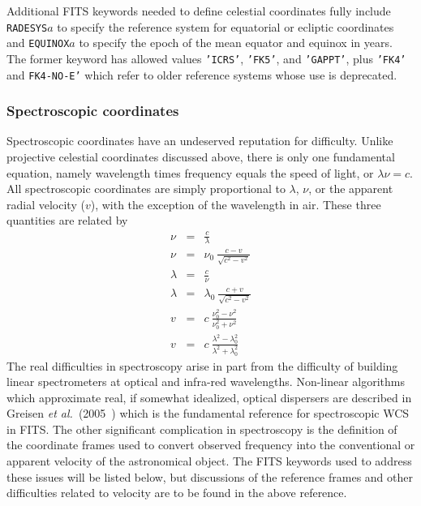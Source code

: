 \documentclass[twoside]{article}
\newcommand{\etal}{{\it et al.}}
\newcommand{\keyw}[1]{\hbox{{\tt #1}}}
\newcommand{\vv}{v}
\begin{document}
Additional FITS keywords needed to define celestial coordinates fully
include \keyw{RADESYS$a$} to specify the reference system for equatorial
or ecliptic coordinates and \keyw{EQUINOX$a$} to specify the epoch of
the mean equator and equinox in years.  The former keyword has allowed
values \keyw{'ICRS'}, \keyw{'FK5'}, and \keyw{'GAPPT'}, plus \keyw{'FK4'}
and \keyw{FK4-NO-E'} which refer to older reference systems whose use
is deprecated.

\subsubsection{Spectroscopic coordinates}
\label{sect:data.specoord}

Spectroscopic coordinates have an undeserved reputation for
difficulty.  Unlike projective celestial coordinates discussed above,
there is only one fundamental equation, namely wavelength times
frequency equals the speed of light, or $\lambda \nu = c$.  All
spectroscopic coordinates are simply proportional to $\lambda$, $\nu$,
or the apparent radial velocity ($\vv$), with the exception of the
wavelength in air.  These three quantities are related by
\begin{eqnarray}
\nu     & = & \frac{c}{\lambda} \\
\nu     & = & \nu_0 \: \frac{c - \vv}{\sqrt{c^2 - \vv^2}} \\
\lambda & = & \frac{c}{\nu} \\
\lambda & = & \lambda_0 \: \frac{c + \vv}{\sqrt{c^2 - \vv^2}} \\
\vv     & = & c \: \frac{\nu_0^2 - \nu^2}{\nu_0^2 + \nu^2} \\
\vv     & = & c \: \frac{\lambda^2-\lambda_0^2} {\lambda^2+\lambda_0^2}
\end{eqnarray}
The real difficulties in spectroscopy arise in part from the
difficulty of building linear spectrometers at optical and infra-red
wavelengths.  Non-linear algorithms which approximate real, if
somewhat idealized, optical dispersers are described in Greisen
\etal~(2005~\cite{GCVA05}) which is the fundamental reference for
spectroscopic WCS in FITS\@.  The other significant complication in
spectroscopy is the definition of the coordinate frames used to
convert observed frequency into the conventional or apparent velocity
of the astronomical object.  The FITS keywords used to address these
issues will be listed below, but discussions of the reference frames
and other difficulties related to velocity are to be found in the
above reference.
\end{document}
